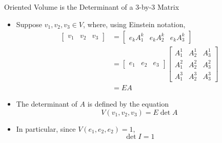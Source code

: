 \documentclass[usenames,dvipsnames,10pt]{beamer}
\begin{document}
\begin{frame}
  {Oriented Volume is the Determinant of a $3$-by-$3$ Matrix}

  \begin{itemize}
  \item Suppose $v_1, v_2, v_3 \in V$, where, using Einstein notation,
    \begin{align*}
      \begin{bmatrix} v_1 & v_2 & v_3 \end{bmatrix}
      &= \begin{bmatrix} e_kA^k_1 & e_kA^k_2 & e_kA^k_3 \end{bmatrix}\\
                          &=  \begin{bmatrix} e_1 & e_2 & e_3 \end{bmatrix}
                            \begin{bmatrix} A^1_1 & A^1_2 & A^1_3 \\ A^2_1 & A^2_2 & A^2_3 \\ A^3_1 & A^3_2 & A^3_3 \end{bmatrix}\\
                          &= EA
    \end{align*}
  \item The determinant of $A$ is defined by the equation
    \[
      V(v_1,v_2,v_3) = E\det A
    \]
  \item In particular, since $V(e_1,e_2,e_2) = 1$,
    \[
      \det I = 1
    \]
  \end{itemize}
  
\end{frame}
\end{document}
